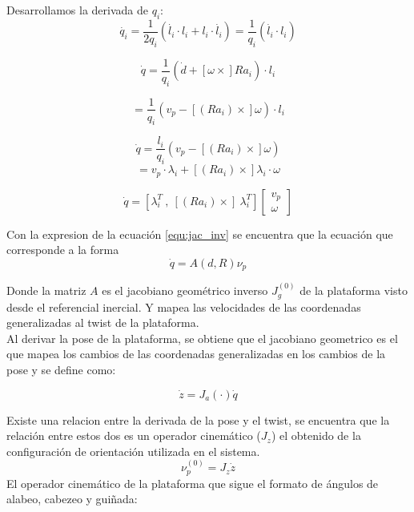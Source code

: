\documentclass[letterpaper, 12pt]{article}
\begin{document}
Desarrollamos la derivada de $q_i$:
\begin{equation}
\dot{q_i} = \frac{1}{2q_i} (\dot{l_i} \cdot l_i + l_i \cdot \dot{l_i}) = \frac{1}{q_i} (\dot{l_i} \cdot l_i)
\end{equation}

\begin{equation}
\dot{q}=\frac{1}{q_i}(\dot{d} + [\omega \times] Ra_i)\cdot l_i 
\end{equation}

\begin{equation*}
= \frac{1}{q_i}(v_p - [(Ra_i)\times]\omega)\cdot l_i
\end{equation*}

\begin{equation}
\dot{q} = \frac{l_i}{q_i}\left( v_p - [(Ra_i)\times]\omega \right) 
\end{equation}
\begin{equation*}
= v_p \cdot \lambda_i + [(Ra_i)\times]\lambda_i \cdot \omega
\end{equation*}

\begin{equation} \label{equ:jac_inv}
\dot{q} = [\lambda_i^T\ ,\ [(Ra_i)\times]\ \lambda_i^T] \begin{bmatrix}
v_p\\
\omega
\end{bmatrix}
\end{equation}

Con la expresion de la ecuación \ref{equ:jac_inv} se encuentra que la ecuación que 
corresponde a la forma
\begin{equation} \label{equ:jac_g}
\dot{q} = A(d,R) \nu_p
\end{equation}

Donde la matriz $A$ es el jacobiano geométrico inverso $J_g^{(0)}$ de la plataforma visto desde el referencial inercial. Y mapea las velocidades de las coordenadas generalizadas al twist de la plataforma.\\

Al derivar la pose de la plataforma, se obtiene que el jacobiano geometrico es el que mapea los cambios de las coordenadas generalizadas en los cambios de la pose y se define como:

\begin{equation} \label{equ:jac_a}
\dot{z} = J_a(\cdot)\dot{q}
\end{equation}

Existe una relacion entre la derivada de la pose y el twist, se encuentra que la relación entre estos dos es un operador cinemático ($J_z$) el obtenido de la configuración de orientación utilizada en el sistema.\\
\begin{equation}
\nu_p^{(0)} = J_z\dot{z}
\end{equation}
El operador cinemático de la plataforma que sigue el formato de ángulos de alabeo, cabezeo y guiñada:
\end{document}
